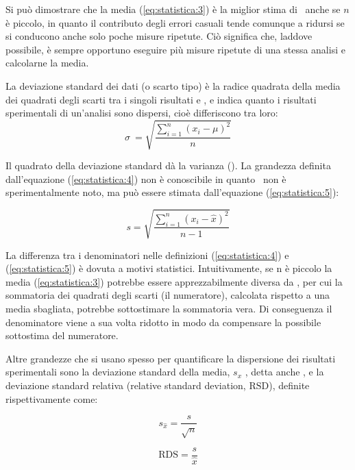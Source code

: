 Si può dimostrare che la media (\ref{eq:statistica:3}) è la miglior stima di \mu\ anche se $n$ è piccolo, in quanto il contributo degli errori casuali tende comunque a ridursi se si conducono anche solo poche misure ripetute. Ciò significa che, laddove possibile, è sempre opportuno eseguire più misure ripetute di una stessa analisi e calcolarne la media.

La deviazione standard dei dati (o scarto tipo) è la radice quadrata della media dei quadrati degli scarti tra i singoli risultati e \mu, e indica quanto i risultati sperimentali di un'analisi sono dispersi, cioè differiscono tra loro:
\begin{equation} \label{eq:statistica:4}
\sigma\ = \sqrt{\frac{\sum_{i=1}^n (x_i - \mu)^2}{n}}
\end{equation}

Il quadrato della deviazione standard dà la varianza (\sigma{}). La grandezza definita dall'equazione (\ref{eq:statistica:4}) non è conoscibile in quanto \mu\ non è sperimentalmente noto, ma può essere stimata dall'equazione (\ref{eq:statistica:5}):

\begin{equation} \label{eq:statistica:5}
s = \sqrt{\frac{\sum_{i=1}^n (x_i - \hat{x})^2}{n-1}}
\end{equation}


La differenza tra i denominatori nelle definizioni (\ref{eq:statistica:4}) e (\ref{eq:statistica:5}) è dovuta a motivi statistici. Intuitivamente, se n è piccolo la media (\ref{eq:statistica:3}) potrebbe essere apprezzabilmente diversa da \mu, per cui la sommatoria dei quadrati degli scarti (il numeratore), calcolata rispetto a una media sbagliata, potrebbe sottostimare la sommatoria vera. Di conseguenza il denominatore viene a sua volta ridotto in modo da compensare la possibile sottostima del numeratore.

Altre grandezze che si usano spesso per quantificare la dispersione dei risultati sperimentali sono la deviazione standard della media, $s_x$ , detta anche , e la deviazione standard relativa (relative standard deviation, $\mathrm{RSD}$), definite rispettivamente come:
	  
\begin{equation} \label{eq:statistica:6}
s_{\hat{x}} = \frac{s}{\sqrt{n}}
\end{equation}

\begin{equation} \label{eq:statistica:7}
\mathrm{RDS} = \frac{s}{\hat{x}}
\end{equation}

